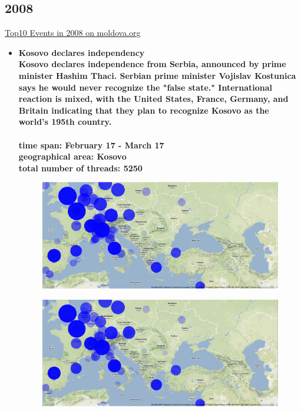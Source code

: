 \documentclass[11pt,a4paper,english]{article}
\begin{document}
			\subsection{2008}
			\href{http://social.moldova.org/news/10-most-important-world-events-of-2008-217389-eng.html}{Top10 Events in 2008 on moldova.org}
				\begin{itemize}
					\item \bf Kosovo declares independency \rm
						\\ Kosovo declares independence from Serbia, announced by prime minister Hashim Thaci. Serbian prime minister Vojislav Kostunica says he would never recognize the "false state." International reaction is mixed, with the United States, France, Germany, and Britain indicating that they plan to recognize Kosovo as the world's 195th country.
						\\\\ \bf time span: \rm February 17 - March 17
						\\ \bf geographical area: \rm Kosovo
						\\ \bf total number of threads: \rm 5250
						\begin{figure}[H]
							\vspace{-13pt}
  							\begin{center}
								\includegraphics[width=130mm]{img/pre-kosovo}
							\end{center}
							\vspace{-13pt}
						\end{figure}
						\begin{figure}[H]
							\vspace{-13pt}
	  						\begin{center}
								\includegraphics[width=130mm]{img/post-kosovo}

\end{center}
\end{figure}
\end{itemize}
\end{document}
